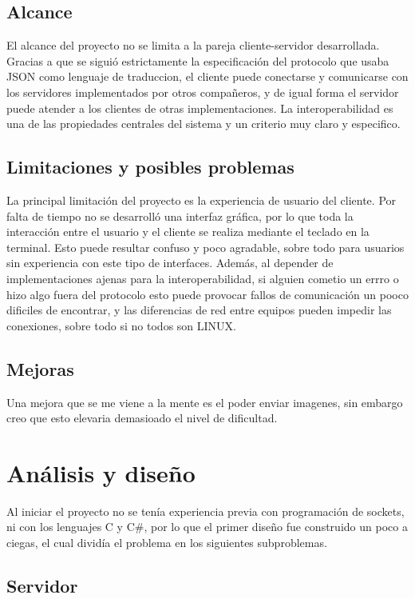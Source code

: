 \documentclass{article}
\begin{document}
\subsection{Alcance}
El alcance del proyecto no se limita a la pareja cliente-servidor
desarrollada. Gracias a que se siguió estrictamente la especificación del
protocolo que usaba JSON como lenguaje de traduccion, el cliente puede conectarse y comunicarse con los servidores
implementados por otros compañeros, y de igual forma el servidor puede atender
a los clientes de otras implementaciones. La interoperabilidad es una de las propiedades centrales del sistema y un criterio muy claro y especifico.

\subsection{Limitaciones y posibles problemas}
La principal limitación del proyecto es la experiencia de usuario del cliente.
Por falta de tiempo no se desarrolló una interfaz gráfica, por lo que toda la
interacción entre el usuario y el cliente se realiza mediante el teclado en la
terminal. Esto puede resultar confuso y poco agradable, sobre todo para
usuarios sin experiencia con este tipo de interfaces. Además, al depender de
implementaciones ajenas para la interoperabilidad, si alguien cometio un errro o hizo algo fuera del protocolo esto puede provocar fallos de comunicación un pooco dificiles de encontrar, y las diferencias de red entre equipos pueden impedir las conexiones, sobre todo si no todos son LINUX.

\subsection{Mejoras}
Una mejora que se me viene a la mente es el poder enviar imagenes, sin embargo creo que esto elevaria demasioado el nivel de dificultad.
\section{Análisis y diseño}
\label{sec:analisis-y-diseno}

Al iniciar el proyecto no se tenía experiencia previa con programación de sockets,
ni con los lenguajes C y C\#, por lo que el primer diseño fue construido un poco a
ciegas, el cual dividía el problema en los siguientes subproblemas.

\subsection{Servidor}
\end{document}
